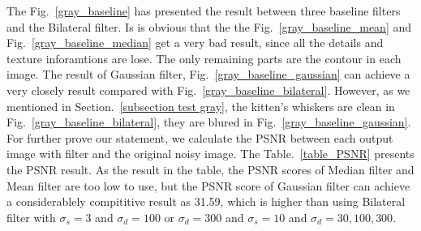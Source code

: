 \documentclass[12pt]{article}
\begin{document}
The Fig.~\ref{gray_baseline} has presented the result between three baseline filters and the Bilateral filter. 
Is is obvious that the the Fig.~\ref{gray_baseline_mean} and Fig.~\ref{gray_baseline_median} get a very bad result, since all the details and texture inforamtions are lose. 
The only remaining parts are the contour in each image.
The result of Gaussian filter, Fig.~\ref{gray_baseline_gaussian} can achieve a very closely result compared with Fig.~\ref{gray_baseline_bilateral}.
However, as we mentioned in Section.~\ref{subsection test gray}, the kitten's whiskers are clean in Fig.~\ref{gray_baseline_bilateral}, they are blured in Fig.~\ref{gray_baseline_gaussian}. 
For further prove our statement, we calculate the PSNR between each output image with filter and the original noisy image.
The Table.~\ref{table_PSNR} presents the PSNR result. 
As the result in the table, the PSNR scores of Median filter and Mean filter are too low to use, but the PSNR score of Gaussian filter can achieve a considerablely compititive result as 31.59, which is higher than using Bilateral filter with $\sigma_s = 3$ and $\sigma_d = 100$ or $\sigma_d = 300$ and $\sigma_s = 10$ and $\sigma_d = 30, 100, 300$. 
\end{document}
